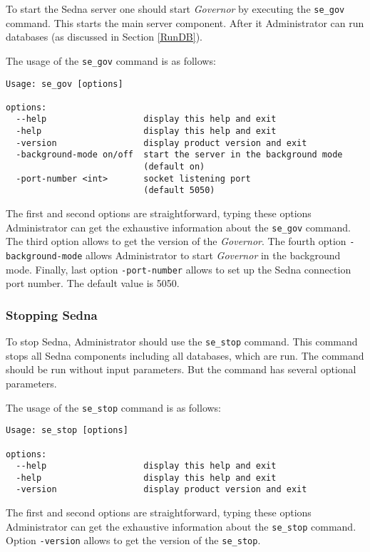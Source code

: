 \documentclass[a4paper,12pt]{article}
\begin{document}
To start the Sedna server one should start \emph{Governor} by executing the \verb!se_gov! command. This starts the main server component. After it Administrator can run databases (as discussed in Section \ref{RunDB}).


The usage of the \verb!se_gov! command is as follows:

\begin{verbatim}
Usage: se_gov [options]

options:
  --help                   display this help and exit
  -help                    display this help and exit
  -version                 display product version and exit
  -background-mode on/off  start the server in the background mode 
                           (default on)
  -port-number <int>       socket listening port
                           (default 5050)
\end{verbatim}

The first and second options are straightforward, typing these options Administrator can get the exhaustive information about the \verb!se_gov! command.
The third option allows to get the version of the \emph{Governor}.
The fourth option \verb!-background-mode! allows Administrator to start \emph{Governor} in the background mode. Finally, last option \verb!-port-number! allows to set up the Sedna connection port number. The default value is 5050.

\subsubsection{Stopping Sedna}

To stop Sedna, Administrator should use the \verb!se_stop! command. This command stops all Sedna components including all databases, which are run. The command should be run without input parameters. But the command has several optional parameters.

The usage of the \verb!se_stop! command is as follows:

\begin{verbatim}
Usage: se_stop [options]

options:
  --help                   display this help and exit
  -help                    display this help and exit
  -version                 display product version and exit
\end{verbatim}
The first and second options are straightforward, typing these options Administrator can get the exhaustive information about the \verb!se_stop! command. Option \verb!-version! allows to get the version of the \verb!se_stop!.
\end{document}
